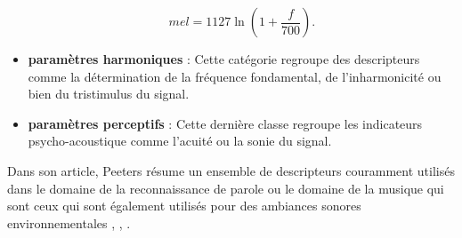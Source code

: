 \begin{itemize}
\begin{equation}\label{eq:melScale}
mel = 1127 \ln\left(1+\frac{f}{700}\right).
\end{equation}


\item \textbf{paramètres harmoniques} : Cette catégorie regroupe des descripteurs comme la détermination de la fréquence fondamental, de  l'inharmonicité ou bien du tristimulus du signal.

\item \textbf{paramètres perceptifs} : Cette dernière classe regroupe les indicateurs psycho-acoustique comme l'acuité ou la sonie du signal.\\
\end{itemize}

Dans son article, Peeters \cite{Peeters} résume un ensemble de descripteurs couramment utilisés dans le domaine de la reconnaissance de parole \cite{Kim} ou le domaine de la musique \cite{Fu} qui sont ceux qui sont également utilisés pour des ambiances sonores environnementales \cite{Cowling}, \cite{Haddad}, \cite{Defreville}. 


%

